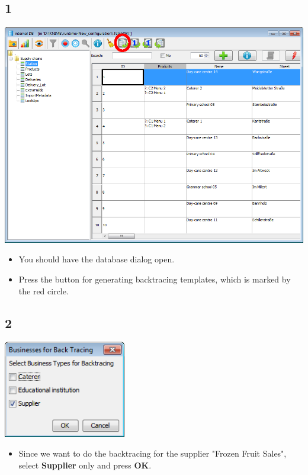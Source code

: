 \documentclass{beamer}
\begin{document}
\subsection{1}
\begin{frame}
	\begin{center}
  		\includegraphics[height=0.6\textheight]{1.png}
	\end{center}
	\begin{itemize}
		\item You should have the database dialog open.
		\item Press the button for generating backtracing templates, which is marked by the red circle.
	\end{itemize}
\end{frame}

\subsection{2}
\begin{frame}
	\begin{center}
  		\includegraphics[width=0.4\textwidth]{2.png}
	\end{center}
	\begin{itemize}
		\item Since we want to do the backtracing for the supplier "Frozen Fruit Sales", select \textbf{Supplier} only and press \textbf{OK}.
	\end{itemize}
\end{frame}
\end{document}
